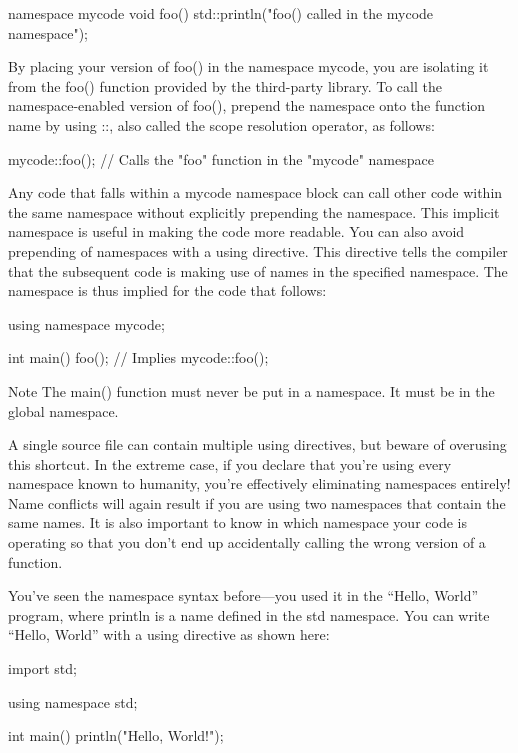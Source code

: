 \begin{cpp}
namespace mycode {
    void foo()
    {
        std::println("foo() called in the mycode namespace");
    }
}
\end{cpp}

By placing your version of foo() in the namespace mycode, you are isolating it from the foo() function provided by the third-party library. To call the namespace-enabled version of foo(), prepend the namespace onto the function name by using ::, also called the scope resolution operator, as follows:

\begin{cpp}
mycode::foo(); // Calls the "foo" function in the "mycode" namespace
\end{cpp}

Any code that falls within a mycode namespace block can call other code within the same namespace without explicitly prepending the namespace. This implicit namespace is useful in making the code more readable. You can also avoid prepending of namespaces with a using directive. This directive tells the compiler that the subsequent code is making use of names in the specified namespace. The namespace is thus implied for the code that follows:

\begin{cpp}
using namespace mycode;

int main()
{
    foo(); // Implies mycode::foo();
}
\end{cpp}

\begin{myNotic}{Note}
The main() function must never be put in a namespace. It must be in the global namespace.
\end{myNotic}

A single source file can contain multiple using directives, but beware of overusing this shortcut. In the extreme case, if you declare that you’re using every namespace known to humanity, you’re effectively eliminating namespaces entirely! Name conflicts will again result if you are using two namespaces that contain the same names. It is also important to know in which namespace your code is operating so that you don’t end up accidentally calling the wrong version of a function.

You’ve seen the namespace syntax before—you used it in the “Hello, World” program, where println is a name defined in the std namespace. You can write “Hello, World” with a using directive as shown here:

\begin{cpp}
import std;

using namespace std;

int main()
{
    println("Hello, World!");
}
\end{cpp}

